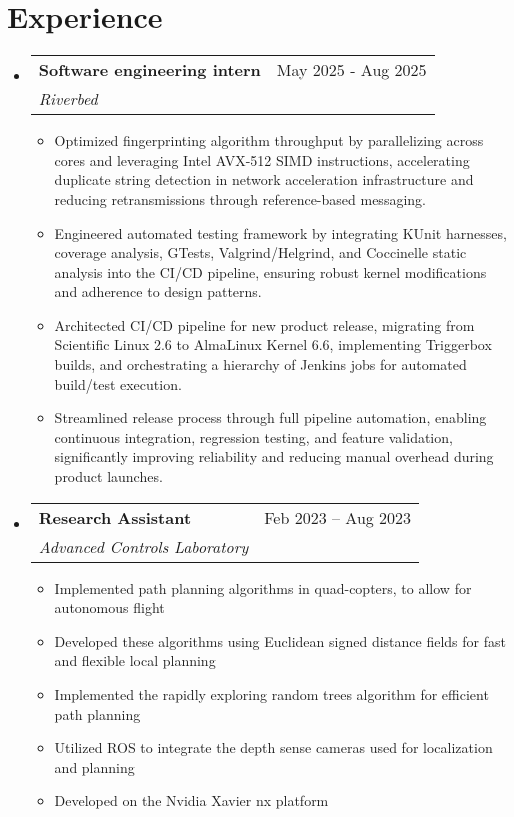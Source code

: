 \documentclass[letterpaper,10pt]{article}
\makeatletter
\newcommand{\resumeItem}[1]{
  \item\small{
    {#1 \vspace{-2pt}}
  }
}
\newcommand{\resumeSubheading}[4]{
  \vspace{-2pt}\item
    \begin{tabular*}{0.97\textwidth}[t]{l@{\extracolsep{\fill}}r}
      \textbf{#1} & #2 \\
      \textit{\small#3} & \textit{\small #4} \\
    \end{tabular*}\vspace{-7pt}
}
\newcommand{\resumeSubHeadingListStart}{\begin{itemize}[leftmargin=0.15in, label={}, itemsep=0pt]}
\newcommand{\resumeSubHeadingListEnd}{\end{itemize}}
\newcommand{\resumeItemListStart}{\begin{itemize}}
\newcommand{\resumeItemListEnd}{\end{itemize}\vspace{-5pt}}
\makeatother
\begin{document}
\section{Experience}
\resumeSubHeadingListStart

\resumeSubheading
{\normalsize Software engineering intern}{May 2025 - Aug 2025}
{Riverbed}{}
\resumeItemListStart
\resumeItem{Optimized fingerprinting algorithm throughput by parallelizing across cores and leveraging Intel AVX-512 SIMD instructions, accelerating duplicate string detection in network acceleration infrastructure and reducing retransmissions through reference-based messaging.}
\resumeItem{Engineered automated testing framework by integrating KUnit harnesses, coverage analysis, GTests, Valgrind/Helgrind, and Coccinelle static analysis into the CI/CD pipeline, ensuring robust kernel modifications and adherence to design patterns.}
\resumeItem{Architected CI/CD pipeline for new product release, migrating from Scientific Linux 2.6 to AlmaLinux Kernel 6.6, implementing Triggerbox builds, and orchestrating a hierarchy of Jenkins jobs for automated build/test execution.}
\resumeItem{Streamlined release process through full pipeline automation, enabling continuous integration, regression testing, and feature validation, significantly improving reliability and reducing manual overhead during product launches.}
\resumeItemListEnd

\resumeSubheading
{\normalsize Research Assistant}{Feb 2023 -- Aug 2023}
{Advanced Controls Laboratory}{}
\resumeItemListStart
\resumeItem{Implemented path planning algorithms in quad-copters, to allow for autonomous flight}
\resumeItem{Developed these algorithms using Euclidean signed distance fields for fast and flexible local planning}
\resumeItem{Implemented the rapidly exploring random trees algorithm for efficient path planning}
\resumeItem{Utilized ROS to integrate the depth sense cameras used for localization and planning}
\resumeItem{Developed on the Nvidia Xavier nx platform}
\resumeItemListEnd

\resumeSubHeadingListEnd

\end{document}
